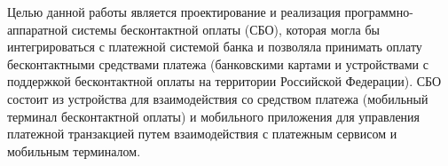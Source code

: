 Целью данной работы является проектирование и реализация программно-аппаратной системы бесконтактной оплаты (СБО), которая могла бы интегрироваться с платежной системой банка и позволяла принимать оплату бесконтактными средствами платежа (банковскими картами и устройствами с поддержкой бесконтактной оплаты на территории Российской Федерации).
СБО состоит из устройства для взаимодействия со средством платежа (мобильный терминал бесконтактной оплаты) и мобильного приложения для управления платежной транзакцией путем взаимодействия с платежным сервисом и мобильным терминалом.
